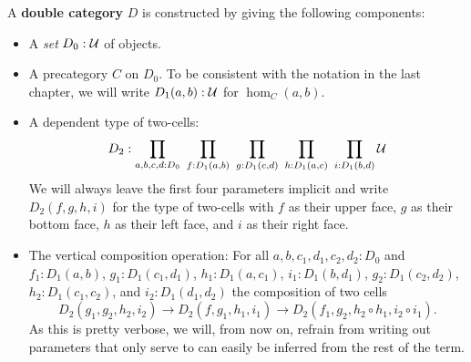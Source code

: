 \begin{defn} \label{def:dbl-cat-hott}
A \textbf{double category} $D$ is constructed by giving the following components:
\begin{itemize}
\item A \emph{set} $D_0 : \mathcal{U}$ of objects.
\item A precategory $C$ on $D_0$. To be consistent with the notation in the last
chapter, we will write $D_1(a, b) : \mathcal{U}$ for $\hom_C(a, b)$.
\item A dependent type of two-cells:
\begin{equation*}
D_2 : \prod_{a,b,c,d:D_0} ~ \prod_{f:D_1(a,b)} ~ \prod_{g:D_1(c,d)}
	~ \prod_{h:D_1(a,c)} ~ \prod_{i:D_1(b,d)} \mathcal{U}
\end{equation*}
We will always leave the first four parameters implicit and write $D_2(f,g,h,i)$
for the type of two-cells with $f$ as their upper face, $g$ as their bottom face,
$h$ as their left face, and $i$ as their right face.
\item The vertical composition operation: For all $a, b, c_1, d_1, c_2, d_2 : D_0$
and $f_1 : D_1(a, b)$, $g_1 : D_1(c_1, d_1)$, $h_1 : D_1(a, c_1)$, $i_1 : D_1(b, d_1)$,
$g_2 : D_1(c_2, d_2)$, $h_2 : D_1(c_1, c_2)$, and $i_2 : D_1(d_1, d_2)$ the composition
of two cells
\begin{equation*}
D_2(g_1, g_2, h_2, i_2) \to D_2(f, g_1, h_1, i_1) 
	\to D_2(f_1, g_2, h_2 \circ h_1, i_2 \circ i_1) \text{.}
\end{equation*}
As this is pretty verbose, we will, from now on, refrain from writing out parameters
that only serve to can easily be inferred from the rest of the term. %


\end{itemize}
\end{defn}
